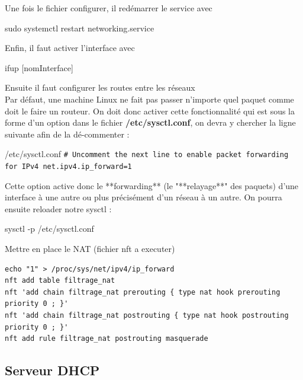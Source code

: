 \documentclass{article}
\begin{document}
Une fois le fichier configurer, il redémarrer le service avec 
\begin{command}
sudo systemctl restart networking.service
\end{command}
Enfin, il faut activer l’interface avec 
\begin{command}
    ifup [nomInterface]
\end{command}
Ensuite il faut configurer les routes entre les réseaux
\\

Par défaut, une machine Linux ne fait pas passer n'importe quel paquet comme doit le faire un routeur. On doit donc activer cette fonctionnalité qui est sous la forme d'un option dans le fichier \textbf{/etc/sysctl.conf}, on devra y chercher la ligne suivante afin de la dé-commenter :

\begin{configbox}{/etc/sysctl.conf}
    \texttt{\# Uncomment the next line to enable packet forwarding for IPv4 net.ipv4.ip\_forward=1}
\end{configbox}

Cette option active donc le **forwarding** (le "**relayage**" des paquets) d'une interface à une autre ou plus précisément d'un réseau à un autre. On pourra ensuite reloader notre sysctl :
\\

\begin{command}
    sysctl -p /etc/sysctl.conf
\end{command}

Mettre en place le NAT (fichier nft a executer) 
\begin{verbatim}
echo "1" > /proc/sys/net/ipv4/ip_forward
nft add table filtrage_nat
nft 'add chain filtrage_nat prerouting { type nat hook prerouting priority 0 ; }'
nft 'add chain filtrage_nat postrouting { type nat hook postrouting priority 0 ; }'
nft add rule filtrage_nat postrouting masquerade
\end{verbatim}

\subsection{Serveur DHCP}
\end{document}
